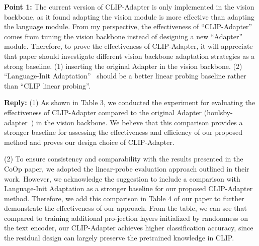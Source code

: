 \documentclass[default]{sn-jnl}%
\theoremstyle{thmstyleone}%
\theoremstyle{thmstyletwo}%
\theoremstyle{thmstylethree}%
\begin{document}
\noindent \textbf{Point 1:} The current version of CLIP-Adapter is only implemented in the vision backbone, as it found adapting the vision module is more effective than adapting the language module. From my perspective, the effectiveness of ``CLIP-Adapter'' comes from tuning the vision backbone instead of designing a new ``Adapter'' module. Therefore, to prove the effectiveness of CLIP-Adapter, it will appreciate that paper should investigate different vision backbone adaptation strategies as a strong baseline.  (1) inserting the original Adapter in the vision backbone. (2) ``Language-Init Adaptation''~\cite{li2022elevater} should be a better linear probing baseline rather than ``CLIP linear probing''.

\noindent \textbf{Reply:} (1) As shown in Table 3, we conducted the experiment for evaluating the effectiveness of CLIP-Adapter compared to the original Adapter (houlsby-adapter~\cite{houlsby2019parameter}) in the vision backbone. We believe that this comparison provides a stronger baseline for assessing the effectiveness and efficiency of our proposed method and proves our design choice of CLIP-Adapter.

\noindent (2) To ensure consistency and comparability with the results presented in the CoOp paper, we adopted the linear-probe evaluation approach outlined in their work. However, we acknowledge the suggestion to include a comparison with Language-Init Adaptation as a stronger baseline for our proposed CLIP-Adapter method.  Therefore, we add this comparison in Table 4 of our paper to further demonstrate the effectiveness of our approach. From the table, we can see that compared to training additional pro-jection layers initialized by randomness on the text
encoder, our CLIP-Adapter achieves higher classification accuracy, since the residual design can largely preserve the pretrained knowledge in CLIP.




\end{document}
